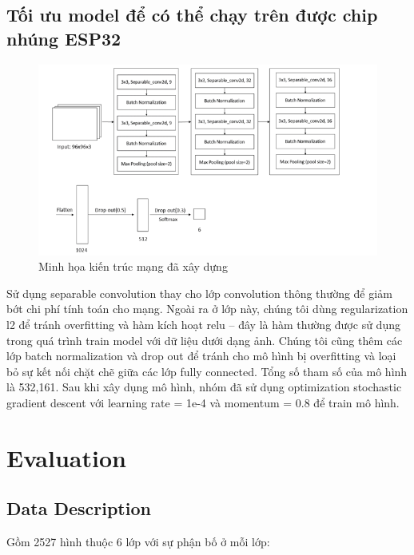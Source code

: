 \subsection{Tối ưu model để có thể chạy trên được chip nhúng ESP32}
\begin{figure}[ht]
    \centering
    \includegraphics[width=\linewidth]{images/ktmang.png}
    \caption{ Minh họa kiến trúc mạng đã xây dựng}
    \label{fig:kientrucmang}
\end{figure}
Sử dụng separable convolution thay cho lớp convolution thông thường để giảm bớt chi phí tính toán cho mạng. Ngoài ra ở lớp này, chúng tôi dùng regularization l2 để tránh overfitting và hàm kích hoạt relu – đây là hàm thường được sử dụng trong quá trình train model với dữ liệu dưới dạng ảnh. Chúng tôi cũng thêm các lớp batch normalization và drop out để tránh cho mô hình bị overfitting và loại bỏ sự kết nối chặt chẽ giữa các lớp fully connected. Tổng số tham số của mô hình là 532,161. Sau khi xây dụng mô hình, nhóm đã sử dụng optimization stochastic gradient descent với learning rate = 1e-4 và momentum = 0.8 để train mô hình.

\section{Evaluation}
\subsection{Data Description} %
Gồm 2527 hình thuộc 6 lớp với sự phận bố ở mỗi lớp:
 
